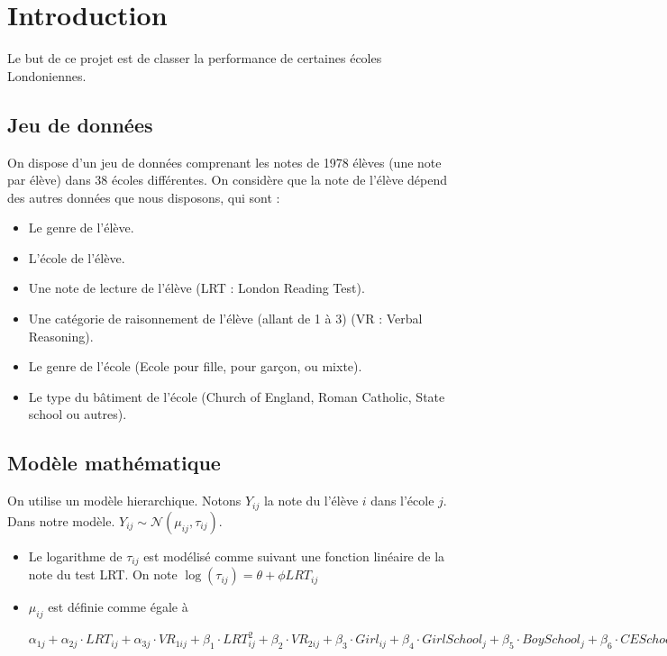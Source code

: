  \section{Introduction}
 Le but de ce projet est de classer la performance de certaines écoles Londoniennes.
 
  \subsection{Jeu de données}
    On dispose d'un jeu de données comprenant les notes de 1978 élèves (une note par élève) dans 38 écoles différentes. On considère que la note de l'élève dépend des autres données que nous disposons, qui sont : 
    \begin{itemize}
        \item Le genre de l'élève.
        \item L'école de l'élève.
        \item Une note de lecture de l'élève (LRT : London Reading Test).
        \item Une catégorie de raisonnement de l'élève (allant de 1 à 3) (VR : Verbal Reasoning).
        
            \item Le genre de l'école (Ecole pour fille, pour garçon, ou mixte).
        \item Le type du bâtiment de l'école (Church of England, Roman Catholic, State school ou autres).
    \end{itemize}
    
    
  \subsection{Modèle mathématique}
    On utilise un modèle hierarchique. Notons $Y_{ij}$ la note du l'élève $i$ dans l'école $j$.
    Dans notre modèle. $Y_{ij} \sim \mathcal{N}( \mu_{ij}, \tau_{ij})$. 
    \begin{itemize}
        \item Le logarithme de $\tau_{ij}$ est modélisé comme suivant une fonction linéaire de la note du test LRT. On note $\log (\tau_{ij}) = \theta + \phi LRT_{ij}$
        \item $\mu_{ij}$ est définie comme égale à 
        
        $\alpha_{1j} 
        + \alpha_{2j}\cdot LRT_{ij} 
        + \alpha_{3j}\cdot VR_{1ij} 
        + \beta_{1}\cdot LRT^{2}_{ij} 
        + \beta_{2}\cdot VR_{2ij} 
        + \beta_{3}\cdot Girl_{ij} 
        + \beta_{4}\cdot GirlSchool_{j} 
        + \beta_{5}\cdot BoySchool_{j} 
        + \beta_{6}\cdot CESchool_{j} 
        + \beta_{7}\cdot RCSchool_{j} 
        + \beta_{8}\cdot OtherSchool_{j}$
    \end{itemize}
    
